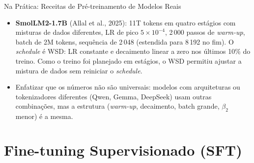 \documentclass[aspectratio=169, xcolor=dvipsnames]{beamer}
\begin{document}
\begin{frame}{Na Prática: Receitas de Pré-treinamento de Modelos Reais}
{\begin{itemize}
      \item \textbf{SmolLM2-1.7B} (Allal et al., 2025): 11T tokens em quatro estágios com misturas de dados diferentes, LR de pico $5\times10^{-4}$, 2\,000 passos de \textit{warm-up}, batch de 2M tokens, sequência de 2\,048 (estendida para 8\,192 no fim). O \textit{schedule} é WSD: LR constante e decaimento linear a zero nos últimos 10\% do treino. Como o treino foi planejado em estágios, o WSD permitiu ajustar a mistura de dados sem reiniciar o \textit{schedule}.
      \item Enfatizar que os números não são universais: modelos com arquiteturas ou tokenizadores diferentes (Qwen, Gemma, DeepSeek) usam outras combinações, mas a estrutura (\textit{warm-up}, decaimento, batch grande, $\beta_2$ menor) é a mesma.
    \end{itemize}
  }
  \end{frame}

  \section{Fine-tuning Supervisionado (SFT)}
\end{document}
